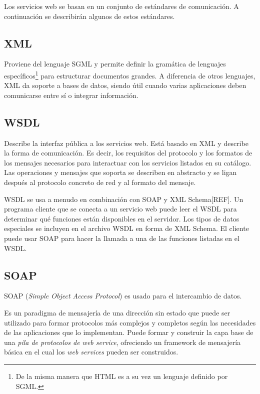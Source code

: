 \documentclass[conference]{IEEEtran}
\begin{document}
Los servicios web se basan en un conjunto de estándares de
comunicación. A continuación se describirán algunos de estos
estándares. 

\subsection{XML}
\label{sec:serv-soa-xml}

Proviene del lenguaje SGML y permite definir la gramática de lenguajes
específicos\footnote{De la misma manera que HTML es a su vez un lenguaje
definido por SGML.} para estructurar documentos grandes. A diferencia
de otros lenguajes, XML da soporte a bases de datos, siendo útil
cuando varias aplicaciones deben comunicarse entre sí o integrar
información.

\subsection{WSDL}
\label{sec:serv-soa-wsdl}

Describe la interfaz pública a los servicios web. Está basado en XML y
describe la forma de comunicación. Es decir, los requisitos del
protocolo y los formatos de los mensajes necesarios para interactuar
con los servicios listados en su catálogo. Las operaciones y mensajes
que soporta se describen en abstracto y se ligan después al protocolo
concreto de red y al formato del mensaje.

WSDL se usa a menudo en combinación con SOAP y XML Schema[REF]. Un programa
cliente que se conecta a un servicio web puede leer el WSDL para
determinar qué funciones están disponibles en el servidor. Los tipos
de datos especiales se incluyen en el archivo WSDL en forma de XML
Schema. El cliente puede usar SOAP para hacer la llamada a una de las
funciones listadas en el WSDL.

\subsection{SOAP}
\label{sec:serv-soa-soap}

SOAP (\textsl{Simple Object Access Protocol}) es usado para el
intercambio de datos.

Es un paradigma de mensajería de una dirección sin estado que puede
ser utilizado para formar protocolos más complejos y completos según
las necesidades de las aplicaciones que lo implementan. Puede formar y
construir la capa base de una \emph{pila de protocolos de web service},
ofreciendo un framework de mensajería básica en el cual los \emph{web
services} pueden ser construidos.
\end{document}
